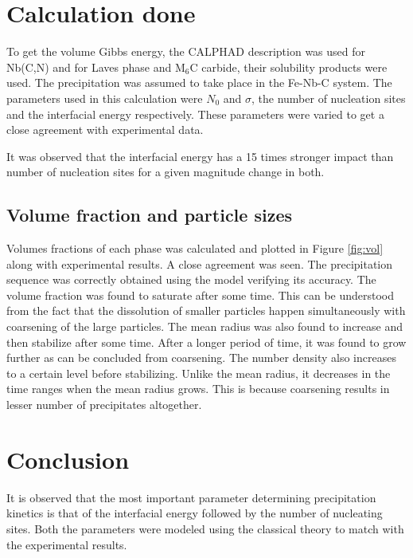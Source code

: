 \documentclass[12pt]{article}
\begin{document}
\section{Calculation done}

To get the volume Gibbs energy, the CALPHAD description was used for Nb(C,N) and for Laves phase and M$_6$C carbide, their solubility products were used. The precipitation was assumed to take place in the Fe-Nb-C system. The parameters used in this calculation were $N_0$ and $\sigma$, the number of nucleation sites and the interfacial energy respectively. These parameters were varied to get a close agreement with experimental data.

It was observed that the interfacial energy has a 15 times stronger impact than number of nucleation sites for a given magnitude change in both.

\subsection{Volume fraction and particle sizes}

Volumes fractions of each phase was calculated and plotted in Figure \ref{fig:vol} along with experimental results. A close agreement was seen. The precipitation sequence was correctly obtained using the model verifying its accuracy.
The volume fraction was found to saturate after some time. This can be understood from the fact that the dissolution of smaller particles happen simultaneously with coarsening of the large particles. The mean radius was also found to increase and then stabilize after some time. After a longer period of time, it was found to grow further as can be concluded from coarsening. The number density also increases to a certain level before stabilizing. Unlike the mean radius, it decreases in the time ranges when the mean radius grows. This is because coarsening results in lesser number of precipitates altogether.

\section{Conclusion}

It is observed that the most important parameter determining precipitation kinetics is that of the interfacial energy followed by the number of nucleating sites. Both the parameters were modeled using the classical theory to match with the experimental results. 
\end{document}
